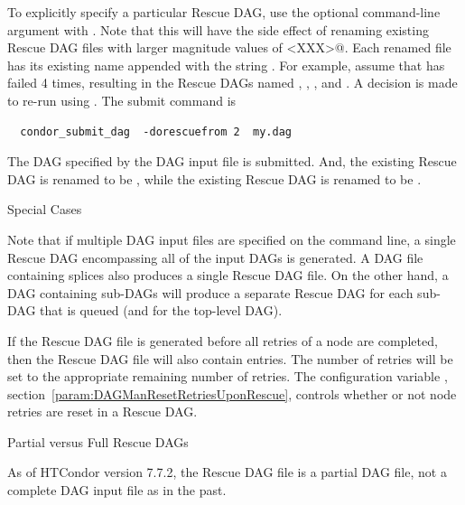To explicitly specify a particular Rescue DAG,
use the optional command-line argument 
with .
Note that this will have the side effect of renaming 
existing Rescue DAG files with larger magnitude values 
of \verb@<XXX>@.
Each renamed file has its existing name appended with
the string .
For example, assume that  has failed 4 times,
resulting in the Rescue DAGs named
,
,
,
and
.
A decision is made to re-run using .
The submit command is
\begin{verbatim}
  condor_submit_dag  -dorescuefrom 2  my.dag
\end{verbatim}
The DAG specified by the DAG input file 
is submitted.
And, the existing Rescue DAG  is
renamed to be ,
while the existing Rescue DAG  is
renamed to be .

\label{dagman:rescue_special_cases}
\begin{description}
\item[Special Cases]
\end{description}

Note that if multiple DAG input files are specified on the
 command line,
a single Rescue DAG encompassing all of the input DAGs is generated.
A DAG file containing splices also produces a single Rescue DAG file.
On the other hand, a DAG containing sub-DAGs will produce a
separate Rescue DAG for each sub-DAG that is queued (and for the
top-level DAG).

If the Rescue DAG file is generated before all retries
of a node are completed, 
then the Rescue DAG file will also contain  entries.
The number of retries will be set to the appropriate remaining
number of retries.
The configuration variable , 
section~\ref{param:DAGManResetRetriesUponRescue},
controls whether or not node retries are reset in a Rescue DAG.


\label{dagman:partial_full_rescue_dag}
\begin{description}
\item[Partial versus Full Rescue DAGs]
\end{description}

As of HTCondor version 7.7.2, the Rescue DAG file is a partial DAG file,
not a complete DAG input file as in the past.

